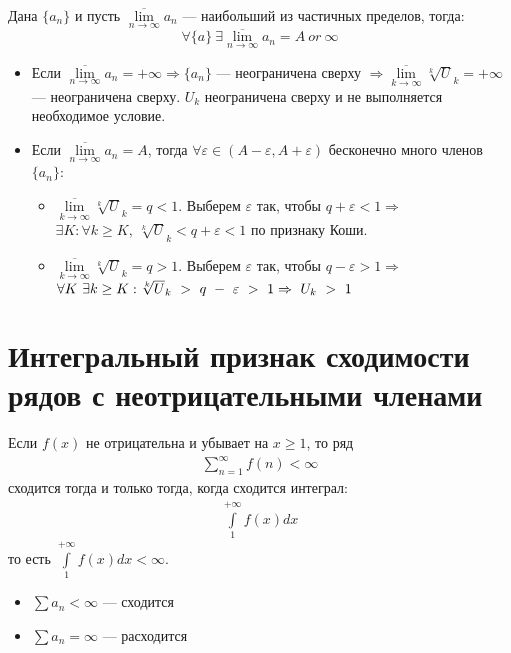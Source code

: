 \begin{definition}
  Дана $\{a_n\}$ и пусть $\overline {\lim\limits_{n\to \infty}} a_n$
  --- наибольший из частичных пределов, тогда:
  $$\forall \{a\} \ \exists \overline{\lim\limits_{n \to \infty}} a_n = A \ or \ \infty $$
  \begin{comment}
    $A$ --- число.
  \end{comment}
  \begin{itemize}
    \item Если $\overline{\lim\limits_{n \to \infty}} a_n = +\infty \Rightarrow
      \{a_n\}$ --- неограничена сверху $\Rightarrow
      \overline{\lim\limits_{k \to \infty}} \sqrt[k]U_k = +\infty$
      --- неограничена сверху. $U_k$ неограничена сверху и не выполняется
      необходимое условие.
    \item Если $\overline{\lim\limits_{n \to \infty}} a_n = A$, тогда
      $\forall \varepsilon \in (A - \varepsilon, A + \varepsilon)$ бесконечно
      много членов $\{a_n\}$: \\
      \begin{itemize}
        \item $\overline{\lim\limits_{k \to \infty}} \sqrt[k]U_k = q < 1$.
          Выберем $\varepsilon$ так, чтобы $q + \varepsilon < 1 \Rightarrow$
          $\exists K: \forall k \geq K, \ \sqrt[k]U_k < q + \varepsilon < 1$ по признаку
          Коши. \\
        \item $\overline{\lim\limits_{k \to \infty}} \sqrt[k]U_k = q > 1$.
          Выберем $\varepsilon$ так, чтобы $q - \varepsilon > 1 \Rightarrow$
          $\forall K \ \exists k \geq K: \sqrt[k]U_k~>~q~-~\varepsilon~>~1 \\
          \Rightarrow~U_k~>~1$
      \end{itemize}
  \end{itemize}
\end{definition}

\section{Интегральный признак сходимости рядов с неотрицательными членами}
\begin{theorem}
  Если $f(x)$ не отрицательна и убывает на $x \geq 1$, то ряд
  \begin{gather}
    \label{th131:series1}
    \sum\limits_{n = 1}^{\infty} f(n) < \infty
  \end{gather}
  сходится тогда и только тогда, когда сходится интеграл:
  \begin{gather}
    \label{th131:integral1}
    \int\limits_1^{+\infty} f(x) dx
  \end{gather}
  то есть $ \int\limits_1^{+\infty} f(x) dx < \infty$. \\
  \begin{itemize}
    \item $\sum a_n < \infty$ --- сходится
    \item $\sum a_n = \infty$ --- расходится
  \end{itemize}
\end{theorem}

